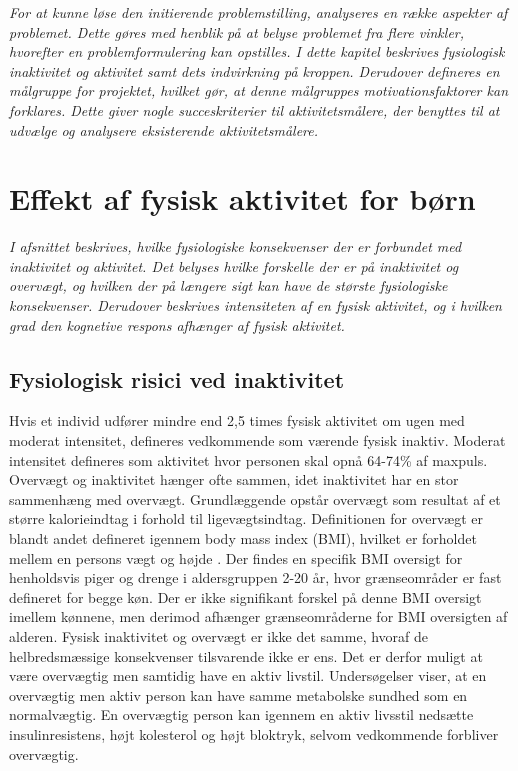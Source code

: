 \textit{For at kunne løse den initierende problemstilling, analyseres en række aspekter af problemet. Dette gøres med henblik på at belyse problemet fra flere vinkler, hvorefter en problemformulering kan opstilles. \newline 
I dette kapitel beskrives fysiologisk inaktivitet og aktivitet samt dets indvirkning på kroppen. Derudover defineres en målgruppe for projektet, hvilket gør, at denne målgruppes motivationsfaktorer kan forklares. Dette giver nogle succeskriterier til aktivitetsmålere, der benyttes til at udvælge og analysere eksisterende aktivitetsmålere.}

\section{Effekt af fysisk aktivitet for børn}\label{sec:fysio}
\textit{I afsnittet beskrives, hvilke fysiologiske konsekvenser der er forbundet med inaktivitet og aktivitet. Det belyses hvilke forskelle der er på inaktivitet og overvægt, og hvilken der på længere sigt kan have de største fysiologiske konsekvenser. Derudover beskrives intensiteten af en fysisk aktivitet, og i hvilken grad den kognetive respons afhænger af fysisk aktivitet.}


\subsection{Fysiologisk risici ved inaktivitet}\label{subsec:inover}
Hvis et individ udfører mindre end 2,5 times fysisk aktivitet om ugen med moderat intensitet, defineres vedkommende som værende fysisk inaktiv. Moderat intensitet defineres som aktivitet hvor personen skal opnå 64-74\% af maxpuls. \citep{Kiens2007} Overvægt og inaktivitet hænger ofte sammen, idet inaktivitet har en stor sammenhæng med overvægt. Grundlæggende opstår overvægt som resultat af et større kalorieindtag i forhold til ligevægtsindtag. \citep{Nestle2014} Definitionen for overvægt er blandt andet defineret igennem body mass index (BMI), hvilket er forholdet mellem en persons vægt og højde \citep{Academic2016}. Der findes en specifik BMI oversigt for henholdsvis piger og drenge i aldersgruppen 2-20 år, hvor grænseområder er fast defineret for begge køn. Der er ikke signifikant forskel på denne BMI oversigt imellem kønnene, men derimod afhænger grænseområderne for BMI oversigten af alderen. \citep{DiseaseControl2015}\newline
Fysisk inaktivitet og overvægt er ikke det samme, hvoraf de helbredsmæssige konsekvenser tilsvarende ikke er ens. Det er derfor muligt at være overvægtig men samtidig have en aktiv livstil. \citep{Kiens2007} Undersøgelser viser, at en overvægtig men aktiv person kan have samme metabolske sundhed som en normalvægtig. En overvægtig person kan igennem en aktiv livsstil nedsætte insulinresistens, højt kolesterol og højt bloktryk, selvom vedkommende forbliver overvægtig. \citep{Lunau2012,Marcelino2012}

